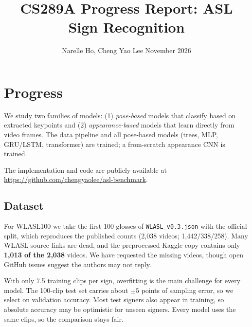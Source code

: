 \documentclass[10pt]{article}
\title{\vspace{-2.0cm}CS289A Progress Report: ASL Sign Recognition}
\author{Narelle Ho, Cheng Yao Lee \quad 6 November 2026}
\date{}
\begin{document}
\maketitle
\vspace{-1.1cm}


\section{Progress}
We study two families of models: (1) \emph{pose-based} models that classify based on extracted keypoints and (2) \emph{appearance-based} models that learn directly from video frames. The data pipeline and all pose-based models (trees, MLP, GRU/LSTM, transformer) are trained; a from-scratch appearance CNN is trained. 

The implementation and code are publicly available at \url{https://github.com/chengyaolee/asl-benchmark}.

\subsection{Dataset}
For WLASL100 we take the first 100 glosses of \texttt{WLASL\_v0.3.json} with the official split, which reproduces
the published counts (2{,}038 videos; 1{,}442/338/258). Many WLASL source links are dead, and the preprocessed Kaggle copy contains
only \textbf{1{,}013 of the 2{,}038} videos. We have requested the missing videos, though open GitHub issues suggest the authors may not reply.

With only 7.5 training clips per sign, overfitting is the main challenge for every model. The 100-clip test set carries about $\pm5$ points of sampling error, so we select on validation accuracy. Most test signers also appear in training, so absolute accuracy may be optimistic for unseen signers. Every model uses the same clips, so the comparison stays fair.
\end{document}
